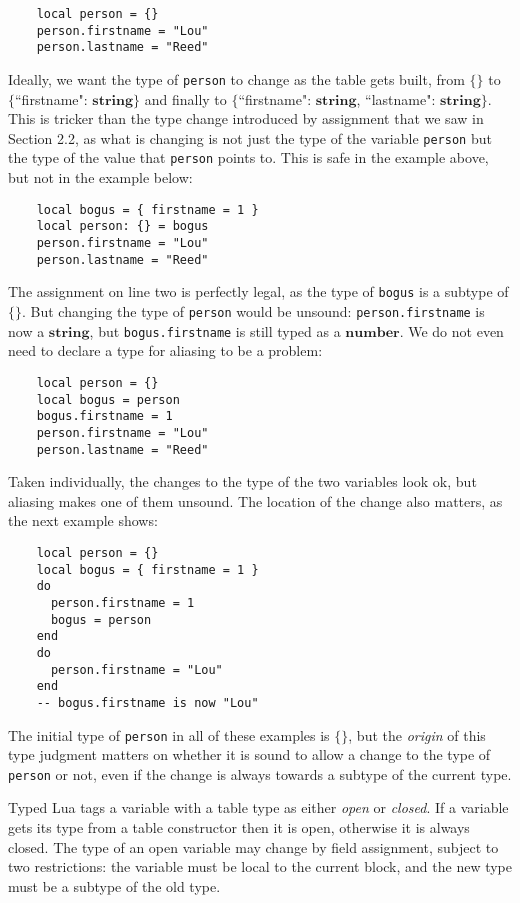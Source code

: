 \documentclass[preprint]{sig-alternate}
\newcommand{\Number}{\mathbf{number}}
\newcommand{\String}{\mathbf{string}}
\begin{document}
\begin{verbatim}
    local person = {}
    person.firstname = "Lou"
    person.lastname = "Reed"
\end{verbatim}

Ideally, we want the type of {\tt person} to change as the
table gets built, from $\{\}$ to $\{$``firstname": $\String\}$
and finally to $\{$``firstname": $\String$, ``lastname":
 $\String\}$. This is tricker than the type change introduced
by assignment that we saw in Section 2.2, as what is changing
is not just the type of the variable {\tt person} but the
type of the value that {\tt person} points to. This is safe
in the example above, but not in the example below:

\begin{verbatim}
    local bogus = { firstname = 1 }
    local person: {} = bogus
    person.firstname = "Lou"
    person.lastname = "Reed"
\end{verbatim}

The assignment on line two is perfectly legal, as the type
of {\tt bogus} is a subtype of $\{\}$. But changing the type
of {\tt person} would be unsound: {\tt person.firstname} is
now a $\String$, but {\tt bogus.firstname} is still typed
as a $\Number$. We do not even need to declare a type for
aliasing to be a problem: 

\begin{verbatim}
    local person = {}
    local bogus = person
    bogus.firstname = 1
    person.firstname = "Lou"
    person.lastname = "Reed"
\end{verbatim}

Taken individually, the changes to the type of the two
variables look ok, but aliasing makes one of them unsound.
The location of the change also matters, as the next example
shows:

\begin{verbatim}
    local person = {}
    local bogus = { firstname = 1 }
    do
      person.firstname = 1
      bogus = person
    end
    do
      person.firstname = "Lou"
    end
    -- bogus.firstname is now "Lou"
\end{verbatim}

The initial type of {\tt person} in all of these examples is
$\{\}$, but the {\em origin} of this type judgment matters
on whether it is sound to allow a change to the type of
{\tt person} or not, even if the change is always towards
a subtype of the current type.

Typed Lua tags a variable with a table type as either
{\em open} or {\em closed}. If a variable gets its type
from a table constructor then it is open, otherwise it is
always closed. The type of an open variable may change
by field assignment, subject to two restrictions: the
variable must be local to the current block, and the new type
must be a subtype of the old type.
\end{document}

